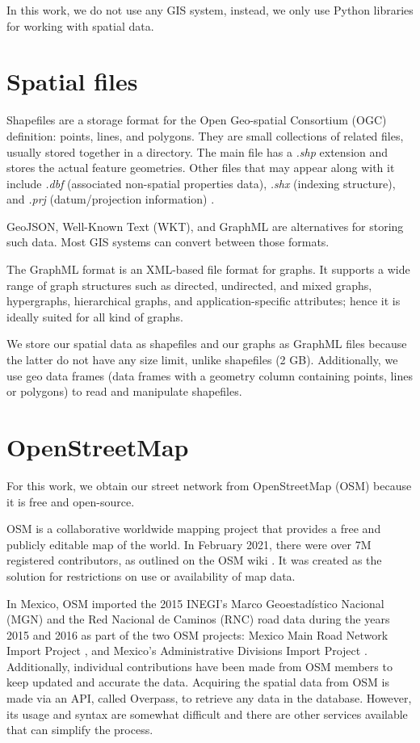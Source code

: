 {{In this work, we do not use any GIS system, instead, we only use Python libraries for working with spatial data.

\section{Spatial files}

Shapefiles are a storage format for the Open Geo-spatial Consortium (OGC) definition: points, lines, and polygons. They are small collections of related files, usually stored together in a directory. The main file has a \textit{.shp} extension and stores the actual feature geometries. Other files that may appear along with it include \textit{.dbf} (associated non-spatial properties data), \textit{.shx} (indexing structure), and \textit{.prj} (datum/projection information) \cite{fox_spatial_2018}.

GeoJSON, Well-Known Text (WKT), and GraphML are alternatives for storing such data. Most GIS systems can convert between those formats.

The GraphML format is an XML-based file format for graphs. It supports a wide range of graph structures such as directed, undirected, and mixed graphs, hypergraphs, hierarchical graphs, and application-specific attributes; hence it is ideally suited for all kind of graphs.

We store our spatial data as shapefiles and our graphs as GraphML files because the latter do not have any size limit, unlike shapefiles (2 GB). Additionally, we use geo data frames (data frames with a geometry column containing points, lines or polygons) to read and manipulate shapefiles.

\section{OpenStreetMap}

For this work, we obtain our street network from OpenStreetMap (OSM) because it is free and open-source.

OSM is a collaborative worldwide mapping project that provides a free and publicly editable map of the world. In February 2021, there were over 7M registered contributors, as outlined on the OSM wiki \cite{osm-wiki}. It was created as the solution for restrictions on use or availability of map data. 

In Mexico, OSM imported the 2015 INEGI's Marco Geoestadístico Nacional (MGN) and the Red Nacional de Caminos (RNC) road data during the years 2015 and 2016 as part of the two OSM projects: Mexico Main Road Network Import Project \cite{osm_RNC_project}, and Mexico's Administrative Divisions Import Project \cite{osm_MGN_project}. Additionally, individual contributions have been made from OSM members to keep updated and accurate the data.
Acquiring the spatial data from OSM is made via an API, called Overpass, to retrieve any data in the database. However, its usage and syntax are somewhat difficult and there are other services available that can simplify the process.

}}
